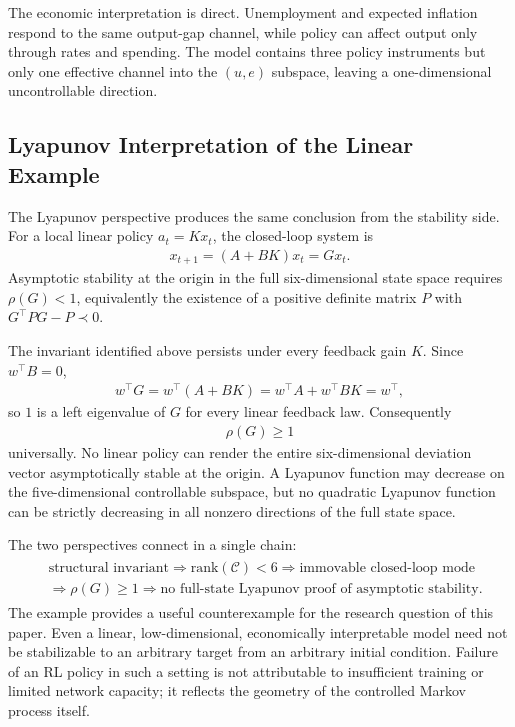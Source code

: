 \documentclass[11pt]{article}
\begin{document}
The economic interpretation is direct. Unemployment and expected inflation respond to the same output-gap channel, while policy can affect output only through rates and spending. The model contains three policy instruments but only one effective channel into the $(u, e)$ subspace, leaving a one-dimensional uncontrollable direction.

\subsection{Lyapunov Interpretation of the Linear Example}
The Lyapunov perspective produces the same conclusion from the stability side. For a local linear policy $a_t = Kx_t$, the closed-loop system is
\begin{align}
    x_{t+1} = (A+BK)x_t = Gx_t.
\end{align}
Asymptotic stability at the origin in the full six-dimensional state space requires $\rho(G) < 1$, equivalently the existence of a positive definite matrix $P$ with $G^\top P G - P \prec 0$.

The invariant identified above persists under every feedback gain $K$. Since $w^\top B = 0$,
\begin{align*}
    w^\top G = w^\top(A+BK) = w^\top A + w^\top BK = w^\top,
\end{align*}
so $1$ is a left eigenvalue of $G$ for every linear feedback law. Consequently
\begin{align}
    \rho(G) \ge 1
\end{align}
universally. No linear policy can render the entire six-dimensional deviation vector asymptotically stable at the origin. A Lyapunov function may decrease on the five-dimensional controllable subspace, but no quadratic Lyapunov function can be strictly decreasing in all nonzero directions of the full state space.

The two perspectives connect in a single chain:
\begin{align*}
    \begin{aligned}
    &\text{structural invariant}
    \Longrightarrow
    \mathrm{rank}(\mathcal{C})<6
    \Longrightarrow
    \text{immovable closed-loop mode} \\
    &\Longrightarrow
    \rho(G)\ge 1
    \Longrightarrow
    \text{no full-state Lyapunov proof of asymptotic stability}.
    \end{aligned}
\end{align*}
The example provides a useful counterexample for the research question of this paper. Even a linear, low-dimensional, economically interpretable model need not be stabilizable to an arbitrary target from an arbitrary initial condition. Failure of an RL policy in such a setting is not attributable to insufficient training or limited network capacity; it reflects the geometry of the controlled Markov process itself.
\end{document}
